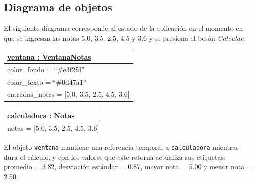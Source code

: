 \documentclass[11pt, a4paper]{article}
\newcommand{\objetobox}[2]{%
\begin{center}
\begin{tabular}{|l|}
\hline
\underline{\textbf{#1}} \\
\hline
#2
\hline
\end{tabular}
\end{center}
}
\begin{document}
\newpage
\subsection{Diagrama de objetos}
El siguiente diagrama corresponde al estado de la aplicación en el momento en que se ingresan
las notas 5.0, 3.5, 2.5, 4.5 y 3.6 y se presiona el botón \textit{Calcular}.

\objetobox{ventana : VentanaNotas}
{%
color\_fondo = ``\#e3f2fd'' \\
color\_texto = ``\#0d47a1'' \\
entradas\_notas = [5.0, 3.5, 2.5, 4.5, 3.6] \\
}

\objetobox{calculadora : Notas}
{%
notas = [5.0, 3.5, 2.5, 4.5, 3.6] \\
}

\noindent El objeto \texttt{ventana} mantiene una referencia temporal a \texttt{calculadora}
mientras dura el cálculo, y con los valores que este retorna actualiza sus etiquetas:
promedio = 3.82, desviación estándar = 0.87, mayor nota = 5.00 y menor nota = 2.50.
\end{document}
